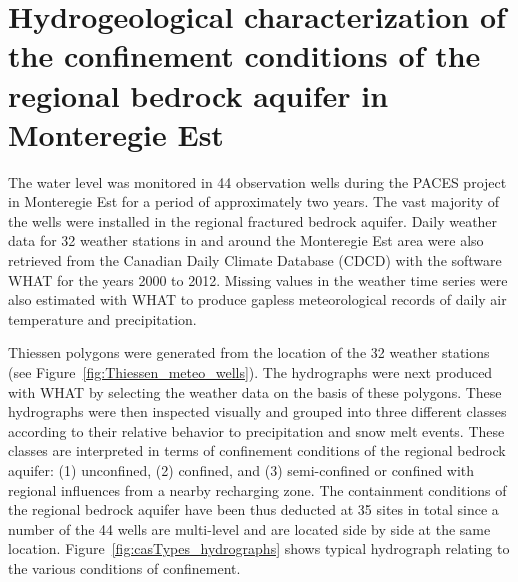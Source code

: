 \documentclass[WHATMANUAL.tex]{subfiles}
\begin{document}
\chapter[Hydrogeological characterization of the confinement conditions of the regional bedrock aquifer in Monteregie Est]{Hydrogeological characterization of the confinement conditions of the regional bedrock aquifer in Monteregie Est\footnotemark}\label{app:confinement_cond_in_MontEst}


The water level was monitored in 44 observation wells during the PACES project in Monteregie Est for a period of approximately two years. The vast majority of the wells were installed in the regional fractured bedrock aquifer. Daily weather data for 32 weather stations in and around the Monteregie Est area were also retrieved from the Canadian Daily Climate Database (CDCD) with the software WHAT for the years 2000 to 2012. Missing values in the weather time series were also estimated with WHAT to produce gapless meteorological records of daily air temperature and precipitation.
 
Thiessen polygons were generated from the location of the 32 weather stations (see Figure~\ref{fig:Thiessen_meteo_wells}). The hydrographs were next produced with WHAT by selecting the weather data on the basis of these polygons. These hydrographs were then inspected visually and grouped into three different classes according to their relative behavior to precipitation and snow melt events. These classes are interpreted in terms of confinement conditions of the regional bedrock aquifer: (1) unconfined, (2) confined, and (3) semi-confined or confined with regional influences from a nearby recharging zone. The containment conditions of the regional bedrock aquifer have been thus deducted at 35 sites in total since a number of the 44 wells are multi-level and are located side by side at the same location. Figure~\ref{fig:casTypes_hydrographs} shows typical hydrograph relating to the various conditions of confinement.
\end{document}
